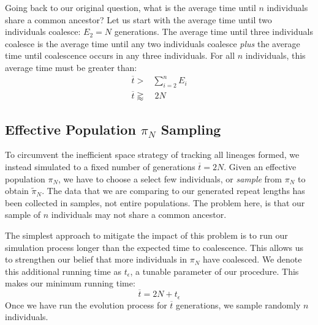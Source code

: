 Going back to our original question, what is the average time until $n$ individuals share a common ancestor?
Let us start with the average time until two individuals coalesce: $E_2 = N$ generations.
The average time until three individuals coalesce is the average time until any two individuals coalesce \emph{plus} the
average time until coalescence occurs in any three individuals.
For all $n$ individuals, this average time must be greater than:
\begin{equation}
    \begin{aligned}
        \overbar{t} >& \sum_{i=2}^{n} E_i \\
        \overbar{t} \gtrapprox& \ 2N
    \end{aligned}
\end{equation}

\subsection{Effective Population $\pi_N$ Sampling}\label{subsec:effectivePopulationPiSampling}
To circumvent the inefficient space strategy of tracking all lineages formed, we instead simulated to a fixed number
of generations $\overbar{t} = 2N$.
Given an effective population $\pi_N$, we have to choose a select few individuals, or \emph{sample} from $\pi_N$ to
obtain $\tilde{\pi}_N$.
The data that we are comparing to our generated repeat lengths has been collected in samples, not entire populations.
The problem here, is that our sample of $n$ individuals may not share a common ancestor.

The simplest approach to mitigate the impact of this problem is to run our simulation process longer than the expected
time to coalescence.
This allows us to strengthen our belief that more individuals in $\pi_N$ have coalesced.
We denote this additional running time as $t_\epsilon$, a tunable parameter of our procedure.
This makes our minimum running time:
\begin{equation}
    \overbar{t} = 2N + t_\epsilon
\end{equation}
Once we have run the evolution process for $\overbar{t}$ generations, we sample randomly $n$ individuals.

